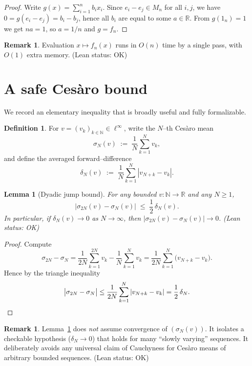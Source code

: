 \documentclass[11pt]{article}
\newtheorem{lemma}[theorem]{Lemma}
\theoremstyle{definition}
\newtheorem{definition}[theorem]{Definition}
\newtheorem{remark}[theorem]{Remark}
\newcommand{\N}{\mathbb{N}}
\newcommand{\R}{\mathbb{R}}
\newcommand{\linf}{\ell^\infty}
\newcommand{\leanok}{\textsf{\small (Lean status: OK)}}
\begin{document}
\begin{proof}
Write $g(x)=\sum_{i=1}^n b_i x_i$. Since $e_i-e_j\in M_n$ for all $i,j$, we have
$0=g(e_i-e_j)=b_i-b_j$, hence all $b_i$ are equal to some $a\in\R$. From $g(1_n)=1$
we get $na=1$, so $a=1/n$ and $g=f_n$.
\end{proof}

\begin{remark}
Evaluation $x\mapsto f_n(x)$ runs in $O(n)$ time by a single pass, with $O(1)$ extra memory.
\leanok
\end{remark}

\section{A safe Ces\`aro bound}\label{sec:cesaro}

We record an elementary inequality that is broadly useful and fully formalizable.

\begin{definition}
For $v=(v_k)_{k\in\N}\in\linf$, write the $N$--th Cesàro mean
\[
  \sigma_N(v)\;:=\;\frac1N\sum_{k=1}^N v_k,
\]
and define the averaged forward--difference
\[
  \delta_N(v)\;:=\;\frac1N\sum_{k=1}^N |v_{N+k}-v_k|.
\]
\end{definition}

\begin{lemma}[Dyadic jump bound]\label{lem:dyadic}
For any bounded $v:\N\to\R$ and any $N\ge1$,
\[
  \bigl|\sigma_{2N}(v)-\sigma_N(v)\bigr|
  \;\le\;\frac12\,\delta_N(v).
\]
In particular, if $\delta_N(v)\to0$ as $N\to\infty$, then
$\bigl|\sigma_{2N}(v)-\sigma_N(v)\bigr|\to0$. \leanok
\end{lemma}

\begin{proof}
Compute
\[
  \sigma_{2N}-\sigma_N
  = \frac{1}{2N}\sum_{k=1}^{2N} v_k - \frac{1}{N}\sum_{k=1}^{N} v_k
  = \frac{1}{2N}\sum_{k=1}^{N}\bigl(v_{N+k}-v_k\bigr).
\]
Hence by the triangle inequality
\[
 \bigl|\sigma_{2N}-\sigma_N\bigr|
 \le \frac{1}{2N}\sum_{k=1}^{N}|v_{N+k}-v_k|
 = \frac12\,\delta_N.\qedhere
\]
\end{proof}

\begin{remark}
Lemma~\ref{lem:dyadic} does \emph{not} assume convergence of $(\sigma_N(v))$.
It isolates a checkable hypothesis ($\delta_N\to0$) that holds for many
``slowly varying'' sequences. It deliberately avoids any universal claim of Cauchyness
for Cesàro means of arbitrary bounded sequences. \leanok
\end{remark}
\end{document}
